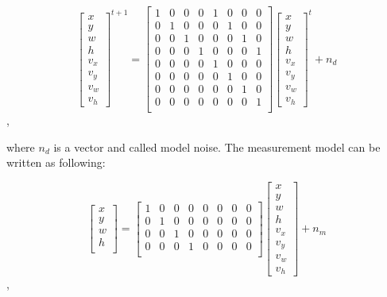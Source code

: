 \documentclass[conference]{IEEEtran}
\begin{document}
\[
\begin{bmatrix}
x \\
y \\
w \\
h \\
v_x \\
v_y \\
v_w \\
v_h
\end{bmatrix}^{t+1}
=
\begin{bmatrix}
1 &0 & 0 & 0  & 1 & 0 &0 &0 \\
0 &1 & 0 & 0  & 0 & 1 &0 &0 \\
0 &0 & 1 & 0  & 0 & 0 &1 &0 \\
0 &0 & 0 & 1  & 0 & 0 &0 &1 \\
0 &0 & 0 & 0  & 1 & 0 &0 &0 \\
0 &0 & 0 & 0  & 0 & 1 &0 &0 \\
0 &0 & 0 & 0  & 0 & 0 &1 &0 \\
0 &0 & 0 & 0  & 0 & 0 &0 &1 \\
\end{bmatrix}
\begin{bmatrix}
x \\
y \\
w \\
h \\
v_x \\
v_y \\
v_w \\
v_h
\end{bmatrix}^t+n_d
\],

where $n_d$ is a vector and called model noise. The measurement model can be written as following:

\[
\begin{bmatrix}
x \\
y \\
w \\
h \\
\end{bmatrix}
=
\begin{bmatrix}
1 &0 & 0 & 0  & 0 & 0 &0 &0 \\
0 &1 & 0 & 0  & 0 & 0 &0 &0 \\
0 &0 & 1 & 0  & 0 & 0 &0 &0 \\
0 &0 & 0 & 1  & 0 & 0 &0 &0 \\

\end{bmatrix}
\begin{bmatrix}
x \\
y \\
w \\
h \\
v_x \\
v_y \\
v_w \\
v_h
\end{bmatrix}+n_m
\],
\end{document}
